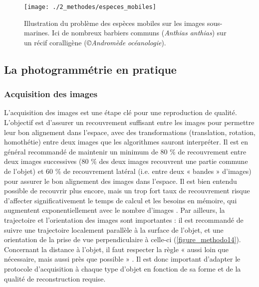 \begin{figure}[H]
	\begin{center}
	\texttt{[image: ./2\_methodes/especes\_mobiles]}
		\caption[Illustration du problème des espèces mobiles sur les images sous-marines]{Illustration du problème des espèces mobiles sur les images sous-marines. Ici de nombreux barbiers communs (\textit{Anthias anthias}) sur un récif coralligène (\textit{©Andromède océanologie}).}
	\label{figure_methodo13}
\end{center}
\end{figure}

\newpage

\subsection{La photogrammétrie en pratique}

\subsubsection{Acquisition des images}

L’acquisition des images est une étape clé pour une reproduction de qualité. L’objectif est d’assurer un recouvrement suffisant entre les images pour permettre leur bon alignement dans l’espace, avec des transformations (translation, rotation, homothétie) entre deux images que les algorithmes sauront interpréter. Il est en général recommandé de maintenir un minimum de 80 \% de recouvrement entre deux images successives (80 \% des deux images recouvrent une partie commune de l’objet) et 60 \% de recouvrement latéral (i.e. entre deux « bandes » d’images) \citep{agisoft_agisoft_2018-1} pour assurer le bon alignement des images dans l’espace. Il est bien entendu possible de recouvrir plus encore, mais un trop fort taux de recouvrement risque d’affecter significativement le temps de calcul et les besoins en mémoire, qui augmentent exponentiellement avec le nombre d’images \citep{agisoft_agisoft_2018}. Par ailleurs, la trajectoire et l’orientation des images sont importantes : il est recommandé de suivre une trajectoire localement parallèle à la surface de l’objet, et une orientation de la prise de vue perpendiculaire à celle-ci (\autoref{figure_methodo14}). Concernant la distance à l’objet, il faut respecter la règle « aussi loin que nécessaire, mais aussi près que possible » \citep{linder_digital_2016}. Il est donc important d’adapter le protocole d’acquisition à chaque type d’objet en fonction de sa forme et de la qualité de reconstruction requise.

